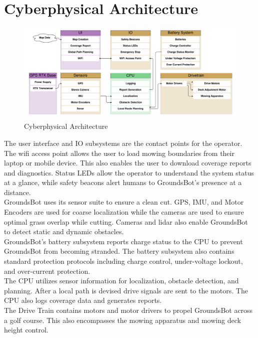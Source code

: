 \documentclass{article}
\begin{document}
\section{Cyberphysical Architecture}
\begin{figure}[H]
\includegraphics[scale=0.2]{cyberphysical}
\caption{Cyberphysical Architecture}
\label{fig:cyberphysical}
\end{figure}

  The user interface and IO subsystems are the contact points for the operator.  The wifi access point allows the user to load mowing boundaries from their laptop or mobile device.  This also enables the user to download coverage reports and diagnostics.  Status LEDs allow the operator to understand the system status at a glance, while safety beacons alert humans to GroundsBot's presence at a distance. \\

  GroundsBot uses its sensor suite to ensure a clean cut. GPS, IMU, and Motor Encoders are used for coarse localization while the cameras are used to ensure optimal grass overlap while cutting.  Cameras and lidar also enable GroundsBot to detect static and dynamic obstacles.\\

  GroundsBot's battery subsystem reports charge status to the CPU to prevent GroundsBot from becoming stranded. The battery subsystem also contains standard protection protocols including charge control, under-voltage lockout, and over-current protection. \\

  The CPU utilizes sensor information for localization, obstacle detection, and planning.  After a local path is devised drive signals are sent to the motors. The CPU also logs coverage data and generates reports.\\

  The Drive Train contains motors and motor drivers to propel GroundsBot across a golf course.  This also encompasses the mowing apparatus and mowing deck height control. \\
\end{document}
